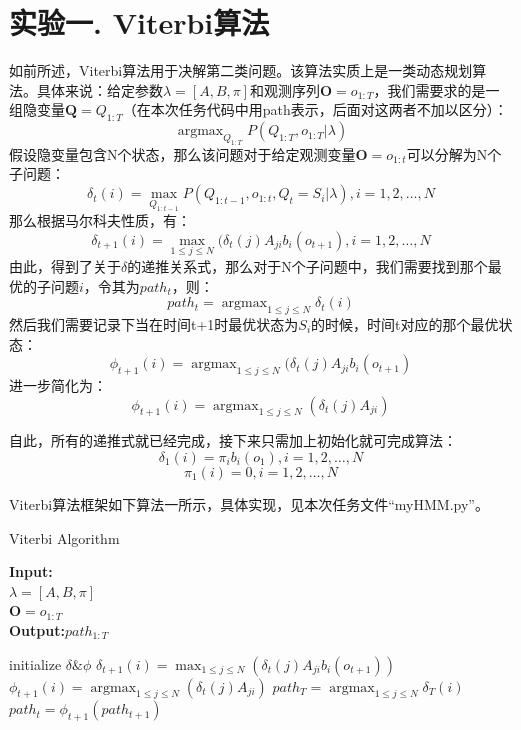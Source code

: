 \documentclass[a4paper,UTF8]{article}
\theoremstyle{definition}
\begin{document}
\section*{实验一. Viterbi算法}
如前所述，Viterbi算法用于决解第二类问题。该算法实质上是一类动态规划算法。具体来说：给定参数$\lambda = [A,B,\pi]$和观测序列$\bm O=o_{1:T}$，我们需要求的是一组隐变量$\bm Q=Q_{1:T}$（在本次任务代码中用path表示，后面对这两者不加以区分）：
\[
\mathop{\arg\max}_{Q_{1:T}}P(Q_{1:T},o_{1:T}|\lambda)
\]
假设隐变量包含N个状态，那么该问题对于给定观测变量$\bm O = o_{1:t}$可以分解为N个子问题：
\[
\delta_t(i)=\max_{Q_{1:t-1}}P(Q_{1:t-1},o_{1:t},Q_t = S_i|\lambda), i = 1,2,\dots,N
\]
那么根据马尔科夫性质，有：
\[
\delta_{t+1}(i) = \max_{1\le j \le N}(\delta_t(j)A_{ji}b_i(o_{t+1}), i = 1,2,\dots, N
\]
由此，得到了关于$\delta$的递推关系式，那么对于N个子问题中，我们需要找到那个最优的子问题$i$，令其为$path_t$，则：
\[
path_t = \mathop{\arg\max}_{1\le j \le N}\delta_t(i)
\]
然后我们需要记录下当在时间t+1时最优状态为$S_i$的时候，时间t对应的那个最优状态：
\[
\phi_{t+1}(i)=\mathop{\arg\max}_{1\le j\le N}(\delta_t(j)A_{ji}b_i(o_{t+1})
\]
进一步简化为：
\[
\phi_{t+1}(i)=\mathop{\arg\max}_{1\le j\le N}(\delta_t(j)A_{ji})
\]

自此，所有的递推式就已经完成，接下来只需加上初始化就可完成算法：
\[
\delta_1(i) = \pi_ib_i(o_1), i = 1,2,\dots,N
\]
\[
\pi_1(i) = 0, i = 1,2,\dots,N
\]

Viterbi算法框架如下算法一所示，具体实现，见本次任务文件“myHMM.py”。
\begin{algorithm}
\label{alg-1}
\caption{Viterbi Algorithm}
\textbf{Input:}\\ 
$\lambda=[A,B,\pi]$\\
$\bm O = o_{1:T}$\\
\textbf{Output:}$path_{1:T}$

\begin{algorithmic}[1]
\STATE initialize $\delta \& \phi$
\STATE $\delta_{t+1}(i) = \max_{1\le j \le N}(\delta_t(j)A_{ji}b_i(o_{t+1}))$
\STATE $\phi_{t+1}(i)=\mathop{\arg\max}_{1\le j\le N}(\delta_t(j)A_{ji})$
\ENDFOR
\STATE $path_T = \mathop{\arg\max}_{1\le j \le N}\delta_T(i)$
\STATE $path_t = \phi_{t+1}(path_{t+1})$
\ENDFOR
\end{algorithmic}
\end{algorithm}
\end{document}
